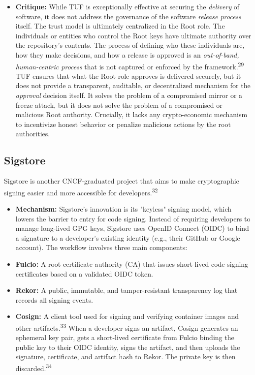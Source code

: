 \documentclass{article}
\begin{document}
\begin{itemize}
\item \textbf{Critique:} While TUF is exceptionally effective at securing the \emph{delivery} of software, it does not address the governance of the software \emph{release process} itself. The trust model is ultimately centralized in the Root role. The individuals or entities who control the Root keys have ultimate authority over the repository's contents. The process of defining who these individuals are, how they make decisions, and how a release is approved is an \emph{out-of-band, human-centric process} that is not captured or enforced by the framework.\textsuperscript{29} TUF ensures that what the Root role approves is delivered securely, but it does not provide a transparent, auditable, or decentralized mechanism for the \emph{approval} decision itself. It solves the problem of a compromised mirror or a freeze attack, but it does not solve the problem of a compromised or malicious Root authority. Crucially, it lacks any crypto-economic mechanism to incentivize honest behavior or penalize malicious actions by the root authorities.
\end{itemize}

\subsection{Sigstore}

Sigstore is another CNCF-graduated project that aims to make cryptographic signing easier and more accessible for developers.\textsuperscript{32}

\begin{itemize}
\item \textbf{Mechanism:} Sigstore's innovation is its "keyless" signing model, which lowers the barrier to entry for code signing. Instead of requiring developers to manage long-lived GPG keys, Sigstore uses OpenID Connect (OIDC) to bind a signature to a developer's existing identity (e.g., their GitHub or Google account). The workflow involves three main components:
\end{itemize}

\begin{itemize}
\item \textbf{Fulcio:} A root certificate authority (CA) that issues short-lived code-signing certificates based on a validated OIDC token.
\item \textbf{Rekor:} A public, immutable, and tamper-resistant transparency log that records all signing events.
\item \textbf{Cosign:} A client tool used for signing and verifying container images and other artifacts.\textsuperscript{33} When a developer signs an artifact, Cosign generates an ephemeral key pair, gets a short-lived certificate from Fulcio binding the public key to their OIDC identity, signs the artifact, and then uploads the signature, certificate, and artifact hash to Rekor. The private key is then discarded.\textsuperscript{34}
\end{itemize}
\end{document}
